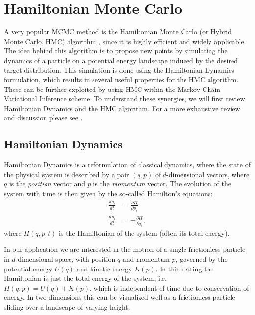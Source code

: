 \section{Hamiltonian Monte Carlo}
\label{sec:HMC}
A very popular MCMC method is the Hamiltonian Monte Carlo (or Hybrid Monte Carlo, HMC) algorithm \parencite{Duane1987}, since it is highly efficient and widely applicable. The idea behind this algorithm is to propose new points by simulating the dynamics of a particle on a potential energy landscape induced by the desired target distribution. This simulation is done using the Hamiltonian Dynamics formulation, which results in several useful properties for the HMC algorithm. These can be further exploited by using HMC within the Markov Chain Variational Inference scheme. To understand these synergies, we will first review Hamiltonian Dynamics and the HMC algorithm. For a more exhaustive review and discussion please see \parencite{Neal2011}.

\subsection{Hamiltonian Dynamics}

Hamiltonian Dynamics is a reformulation of classical dynamics, where the state of the physical system is described by a pair $(q, p)$ of $d$-dimensional vectors, where $q$ is the \textit{position} vector and $p$ is the \textit{momentum} vector. The evolution of the system with time is then given by the so-called Hamilton's equations:
\begin{equation} \label{eq:HamiltonsEquations}
\begin{split}
\frac{dq_i}{dt} &= \frac{\partial H}{\partial p_i} \\
\frac{dp_i}{dt} &= - \frac{\partial H}{\partial q_i},
\end{split}
\end{equation}
where $H(q, p, t)$ is the Hamiltonian of the system (often its total energy).

In our application we are interested in the motion of a single frictionless particle in $d$-dimensional space, with position $q$ and momentum $p$, governed by the potential energy $U(q)$ and kinetic energy $K(p)$. In this setting the Hamiltonian is just the total energy of the system, i.e. $H(q, p) = U(q) + K(p)$, which is independent of time due to conservation of energy. In two dimensions this can be visualized well as a frictionless particle sliding over a landscape of varying height.


